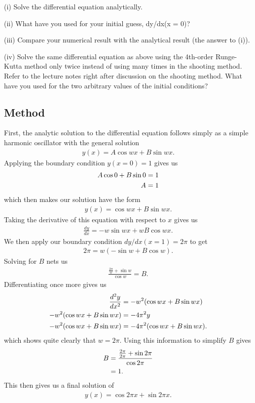 \documentclass[10pt,letter]{article}
\begin{document}
(i) Solve the differential equation analytically.

(ii) What have you used for your initial guess, dy/dx(x = 0)?

(iii) Compare your numerical result with the analytical result (the answer to (i)).

(iv) Solve the same differential equation as above using the 4th-order Runge-Kutta method only
twice instead of using many times in the shooting method. Refer to the lecture notes right
after discussion on the shooting method. What have you used for the two arbitrary values of
the initial conditions?

\subsection{Method}

First, the analytic solution to the differential equation follows simply as a simple harmonic oscillator with the general solution
\begin{align}
y(x) = A\cos{wx} + B\sin{wx}.
\end{align}
Applying the boundary condition $y(x=0) = 1$ gives us 
\begin{align}
A\cos{0} + B\sin{0} &= 1 \notag \\
A &= 1
\end{align}
which then makes our solution have the form
\begin{align}
y(x) = \cos{wx} + B\sin{wx}.
\end{align}
Taking the derivative of this equation with respect to $x$ gives us
\begin{align}
\frac{dy}{dx} = -w\sin{wx} + wB\cos{wx}.
\end{align}
We then apply our boundary condition $dy/dx(x=1)=2\pi$ to get
\begin{align}
2\pi = w(-\sin{w} + B\cos{w}).
\end{align}
Solving for $B$ nets us
\begin{align}
\frac{\frac{2\pi}{w} + \sin{w}}{\cos{w}} =B.
\end{align}
Differentiating once more gives us
\begin{align}
\frac{d^2y}{dx^2} &= -w^2(\cos{wx} + B\sin{wx}) \notag \\
-w^2(\cos{wx} + B\sin{wx}) &= -4\pi^2y \notag \\
-w^2(\cos{wx} + B\sin{wx}) &= -4\pi^2(\cos{wx} + B\sin{wx}).
\end{align}
which shows quite clearly that $w = 2\pi$. Using this information to simplify $B$ gives\begin{align}
B&=\frac{\frac{2\pi}{2\pi} + \sin{2\pi}}{\cos{2\pi}} \notag \\
&= 1.
\end{align}
This then gives us a final solution of 
\begin{align}
y(x) = \cos{2\pi x} + \sin{2\pi x}.
\end{align}
\end{document}
